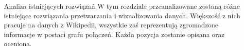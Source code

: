 \begin{chapter}{Analiza istniejących rozwiązań}
	\newcommand{\chapterPath}{rozdzialy/2_0_rozwiazania}
	W tym rozdziale przeanalizowane zostaną różne istniejące rozwiązania przetwarzania i wizualizowania danych. Większość z nich pracuje na danych z Wikipedii, wszystkie zaś reprezentują zgromadzone informacje w postaci grafu połączeń. Każda pozycja zostanie opisana oraz oceniona.
	
	
	
	
\end{chapter}
